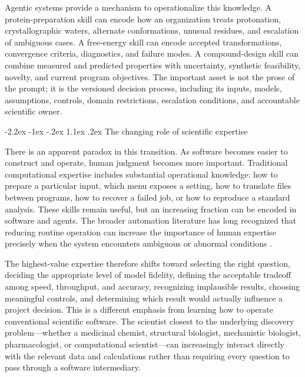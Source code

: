 \documentclass[11pt]{article}
\makeatletter
\renewcommand\section{\@startsection{section}{1}{\z@}%
  {-2.2ex \@plus -1ex \@minus -.2ex}%
  {1.1ex \@plus .2ex}%
  {\normalfont\Large\bfseries\color{molblue}}}
\makeatother
\begin{document}
Agentic systems provide a mechanism to operationalize this knowledge. A protein-preparation skill can encode how an organization treats protonation, crystallographic waters, alternate conformations, unusual residues, and escalation of ambiguous cases. A free-energy skill can encode accepted transformations, convergence criteria, diagnostics, and failure modes. A compound-design skill can combine measured and predicted properties with uncertainty, synthetic feasibility, novelty, and current program objectives. The important asset is not the prose of the prompt; it is the versioned decision process, including its inputs, models, assumptions, controls, domain restrictions, escalation conditions, and accountable scientific owner.

\section{The changing role of scientific expertise}

There is an apparent paradox in this transition. As software becomes easier to construct and operate, human judgment becomes more important. Traditional computational expertise includes substantial operational knowledge: how to prepare a particular input, which menu exposes a setting, how to translate files between programs, how to recover a failed job, or how to reproduce a standard analysis. These skills remain useful, but an increasing fraction can be encoded in software and agents. The broader automation literature has long recognized that reducing routine operation can increase the importance of human expertise precisely when the system encounters ambiguous or abnormal conditions \citep{bainbridge1983ironies}.

The highest-value expertise therefore shifts toward selecting the right question, deciding the appropriate level of model fidelity, defining the acceptable tradeoff among speed, throughput, and accuracy, recognizing implausible results, choosing meaningful controls, and determining which result would actually influence a project decision. This is a different emphasis from learning how to operate conventional scientific software. The scientist closest to the underlying discovery problem---whether a medicinal chemist, structural biologist, mechanistic biologist, pharmacologist, or computational scientist---can increasingly interact directly with the relevant data and calculations rather than requiring every question to pass through a software intermediary.
\end{document}
